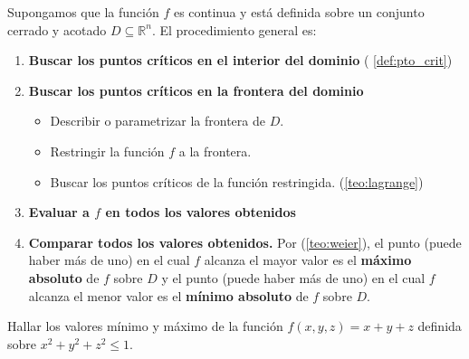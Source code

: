  \begin{obs}  Supongamos que la funci\'on \(f\) es continua y está definida sobre un conjunto cerrado y acotado \(D \subseteq \mathbb{R}^n\). El procedimiento general es:

\begin{enumerate}
    \item \textbf{Buscar los puntos críticos en el interior del dominio} ( \ref{def:pto_crit})
    \item \textbf{Buscar los puntos críticos en  la frontera del dominio}   
    \begin{itemize}
        \item Describir o parametrizar la frontera de \(D\).
        \item Restringir la función \(f\) a la frontera.
        \item Buscar los puntos cr\'iticos de la función restringida. (\ref{teo:lagrange})
    \end{itemize}
      \item \textbf{Evaluar a $f$ en todos los valores obtenidos}

    \item \textbf{Comparar todos los valores obtenidos.} Por  (\ref{teo:weier}), el punto (puede haber m\'as de uno) en el cual $f$ alcanza el  mayor valor es el \textbf{máximo absoluto} de $f$ sobre $D$ y el punto (puede haber m\'as de uno) en el cual $f$ alcanza el  menor valor  es el \textbf{mínimo absoluto} de \(f\) sobre \(D\).
\end{enumerate}
\end{obs}



\begin{tarea}
Hallar los valores  m\'inimo y  m\'aximo de la funci\'on  $\displaystyle f(x,y,z)= x+y+z$ definida sobre    $\displaystyle   x^{2}+y^{2}+z^{2} \leq 1. $
\end{tarea}












